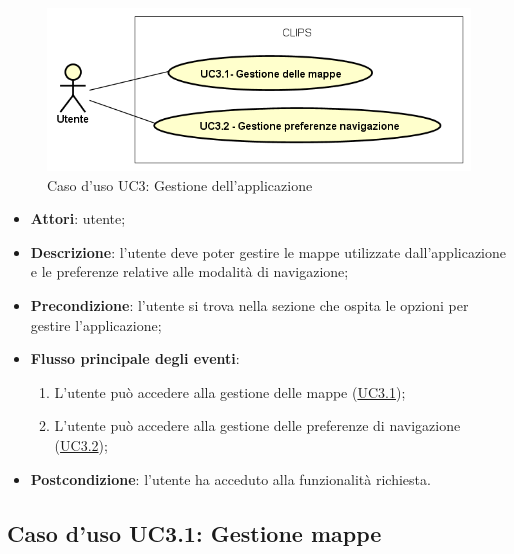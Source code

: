 \documentclass[../AnalisiDeiRequisiti.tex]{subfiles}
\begin{document}
\begin{figure}[H]
	\centering
	\includegraphics[scale=0.95, width=\textwidth]{img/UC3.png}
	\caption{Caso d'uso UC3: Gestione dell'applicazione}\label{fig:UC3} 
\end{figure}
\begin{itemize}
	\item \textbf{Attori}: utente;
	\item \textbf{Descrizione}: l'utente deve poter gestire le mappe utilizzate dall'applicazione e le preferenze relative alle modalità di navigazione; 
	\item \textbf{Precondizione}: l'utente si trova nella sezione che ospita le opzioni per gestire l'applicazione;
	
	\item \textbf{Flusso principale degli eventi}:
	\begin{enumerate}
		\item L'utente può accedere alla gestione delle mappe (\hyperlink{UC3.1}{UC3.1});
		\item L'utente può accedere alla gestione delle preferenze di navigazione (\hyperlink{UC3.2}{UC3.2});
		
	\end{enumerate}
	\item \textbf{Postcondizione}: l'utente ha acceduto alla funzionalità richiesta.
\end{itemize}
\hypertarget{UC3.1}{}
\subsection{Caso d'uso UC3.1: Gestione mappe}
\end{document}
